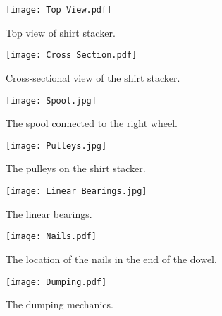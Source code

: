 \documentclass[12pt,letterpaper]{article}
\begin{document}
\begin{figure}[ht]
  \centering
    \texttt{[image: Top View.pdf]}
    \caption{Top view of shirt stacker.}
    \label{topview}
\end{figure}
\begin{figure}[ht]
  \centering
    \texttt{[image: Cross Section.pdf]}
    \caption{Cross-sectional view of the shirt stacker.}
    \label{crossection}
\end{figure}
\begin{figure}[ht]
  \centering
    \texttt{[image: Spool.jpg]}
    \caption{The spool connected to the right wheel.}
    \label{spool}
\end{figure}
\begin{figure}[ht]
  \centering
    \texttt{[image: Pulleys.jpg]}
    \caption{The pulleys on the shirt stacker.}
    \label{pulleys}
\end{figure}
\begin{figure}[ht]
  \centering
    \texttt{[image: Linear Bearings.jpg]}
    \caption{The linear bearings.}
    \label{linearbearings}
\end{figure}
\begin{figure}[ht]
  \centering
    \texttt{[image: Nails.pdf]}
    \caption{The location of the nails in the end of the dowel.}
    \label{nails}
\end{figure}
\begin{figure}[ht]
      \texttt{[image: Dumping.pdf]}
    \caption{The dumping mechanics.}
    \label{dumping}
\end{figure}
\end{document}
